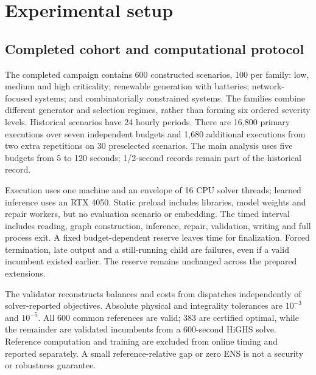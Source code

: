 \section{Experimental setup}
\subsection{Completed cohort and computational protocol}
The completed campaign contains 600 constructed scenarios, 100 per family:
low, medium and high criticality; renewable generation with batteries;
network-focused systems; and combinatorially constrained systems. The families
combine different generator and selection regimes, rather than forming six
ordered severity levels. Historical scenarios have 24 hourly periods.
There are 16,800 primary executions over seven independent budgets and 1,680
additional executions from two extra repetitions on 30 preselected scenarios.
The main analysis uses five budgets from 5 to 120 seconds; 1/2-second records
remain part of the historical record.

Execution uses one machine and an envelope of 16 CPU solver threads; learned
inference uses an RTX 4050. Static preload includes libraries, model weights
and repair workers, but no evaluation scenario or embedding. The timed
interval includes reading, graph construction, inference, repair, validation,
writing and full process exit. A fixed budget-dependent reserve leaves time
for finalization. Forced termination, late output and a still-running child
are failures, even if a valid incumbent existed earlier. The reserve remains
unchanged across the prepared extensions.

The validator reconstructs balances and costs from dispatches independently
of solver-reported objectives. Absolute physical and integrality tolerances
are $10^{-3}$ and $10^{-5}$. All 600 common references are valid; 383 are
certified optimal, while the remainder are validated incumbents from a
600-second HiGHS solve. Reference computation and training are excluded from
online timing and reported separately. A small reference-relative gap or zero
ENS is not a security or robustness guarantee.

